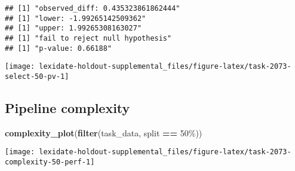 \documentclass[
]{book}
\newenvironment{Shaded}{\begin{snugshade}}{\end{snugshade}}
\newcommand{\AttributeTok}[1]{\textcolor[rgb]{0.13,0.29,0.53}{#1}}
\newcommand{\DecValTok}[1]{\textcolor[rgb]{0.00,0.00,0.81}{#1}}
\newcommand{\FunctionTok}[1]{\textcolor[rgb]{0.13,0.29,0.53}{\textbf{#1}}}
\newcommand{\NormalTok}[1]{#1}
\newcommand{\OtherTok}[1]{\textcolor[rgb]{0.56,0.35,0.01}{#1}}
\newcommand{\SpecialCharTok}[1]{\textcolor[rgb]{0.81,0.36,0.00}{\textbf{#1}}}
\newcommand{\StringTok}[1]{\textcolor[rgb]{0.31,0.60,0.02}{#1}}
\begin{document}
\begin{Shaded}
\end{Shaded}

\begin{verbatim}
## [1] "observed_diff: 0.435323861862444"
## [1] "lower: -1.99265142509362"
## [1] "upper: 1.99265308163027"
## [1] "fail to reject null hypothesis"
## [1] "p-value: 0.66188"
\end{verbatim}

\texttt{[image: lexidate-holdout-supplemental\_files/figure-latex/task-2073-select-50-pv-1]}

\hypertarget{pipeline-complexity-40}{%
\subsection{Pipeline complexity}\label{pipeline-complexity-40}}

\begin{Shaded}
\begin{Highlighting}[]
\FunctionTok{complexity\_plot}\NormalTok{(}\FunctionTok{filter}\NormalTok{(task\_data, split }\SpecialCharTok{==} \StringTok{\textquotesingle{}50\%\textquotesingle{}}\NormalTok{))}
\end{Highlighting}
\end{Shaded}

\texttt{[image: lexidate-holdout-supplemental\_files/figure-latex/task-2073-complexity-50-perf-1]}
\end{document}
